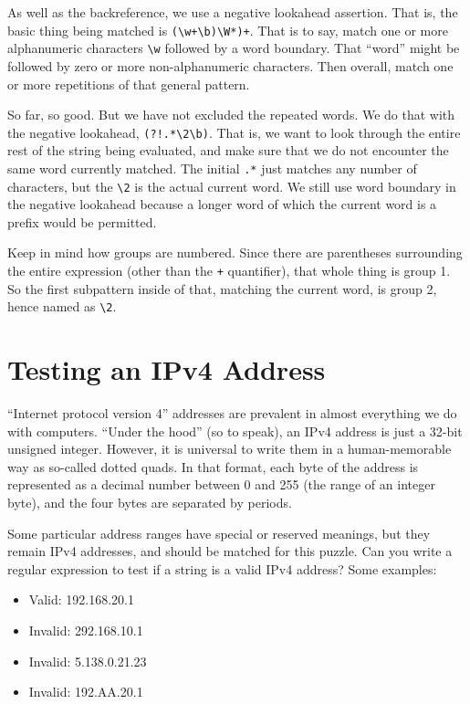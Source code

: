 As well as the backreference, we use a negative lookahead assertion.
That is, the basic thing being matched is
\texttt{(\textbackslash{}w+\textbackslash{}b)\textbackslash{}W*)+}. That
is to say, match one or more alphanumeric characters
\texttt{\textbackslash{}w} followed by a word boundary. That ``word''
might be followed by zero or more non-alphanumeric characters. Then
overall, match one or more repetitions of that general pattern.

So far, so good. But we have not excluded the repeated words. We do that
with the negative lookahead,
\texttt{(?!.*\textbackslash{}2\textbackslash{}b)}. That is, we want to
look through the entire rest of the string being evaluated, and make
sure that we do not encounter the same word currently matched. The
initial \texttt{.*} just matches any number of characters, but the
\texttt{\textbackslash{}2} is the actual current word. We still use word
boundary in the negative lookahead because a longer word of which the
current word is a prefix would be permitted.

Keep in mind how groups are numbered. Since there are parentheses
surrounding the entire expression (other than the \texttt{+}
quantifier), that whole thing is group 1. So the first subpattern inside
of that, matching the current word, is group 2, hence named as
\texttt{\textbackslash{}2}.

\newpage

\hypertarget{testing-an-ipv4-address}{%
\section{Testing an IPv4 Address}\label{testing-an-ipv4-address}}

``Internet protocol version 4'' addresses are prevalent in almost
everything we do with computers. ``Under the hood'' (so to speak), an
IPv4 address is just a 32-bit unsigned integer. However, it is universal
to write them in a human-memorable way as so-called dotted quads. In
that format, each byte of the address is represented as a decimal number
between 0 and 255 (the range of an integer byte), and the four bytes are
separated by periods.

Some particular address ranges have special or reserved meanings, but
they remain IPv4 addresses, and should be matched for this puzzle. Can
you write a regular expression to test if a string is a valid IPv4
address? Some examples:

\begin{itemize}
\tightlist
\item
  Valid: 192.168.20.1
\item
  Invalid: 292.168.10.1
\item
  Invalid: 5.138.0.21.23
\item
  Invalid: 192.AA.20.1
\end{itemize}

